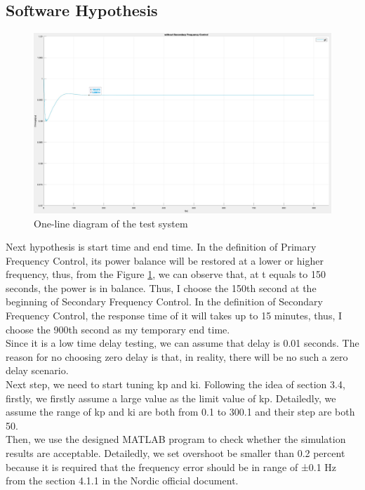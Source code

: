 \documentclass{report}
\begin{document}
\subsection{Software Hypothesis} %

\begin{figure}[htbp]
\centering
\includegraphics[width = \textwidth]{figure/4_1_1_without3.jpeg}
\caption{One-line diagram of the test system}
\label{4_1_1_without3}
\end{figure}
Next hypothesis is start time and end time. In the definition of Primary Frequency Control, its power balance will be restored at a lower or higher frequency, thus, from the Figure \textcolor{red}{\ref{4_1_1_without3}}, we can observe that, at t equals to 150 seconds, the power is in balance. Thus, I choose the 150th second at the beginning of Secondary Frequency Control. In the definition of Secondary Frequency Control, the response time of it will takes up to 15 minutes, thus, I choose the 900th second as my temporary end time.\\

Since it is a low time delay testing, we can assume that delay is 0.01 seconds. The reason for no choosing zero delay is that, in reality, there will be no such a zero delay scenario.\\

Next step, we need to start tuning kp and ki. Following the idea of section 3.4, firstly, we firstly assume a large value as the limit value of kp. Detailedly, we assume the range of kp and ki are both from 0.1 to 300.1 and their step are both 50. \\

Then, we use the designed MATLAB program to check whether the simulation results are acceptable. Detailedly, we set overshoot be smaller than 0.2 percent because it is required that the frequency error should be in range of ±0.1 Hz from the section 4.1.1 in the Nordic official document.\\
\end{document}
